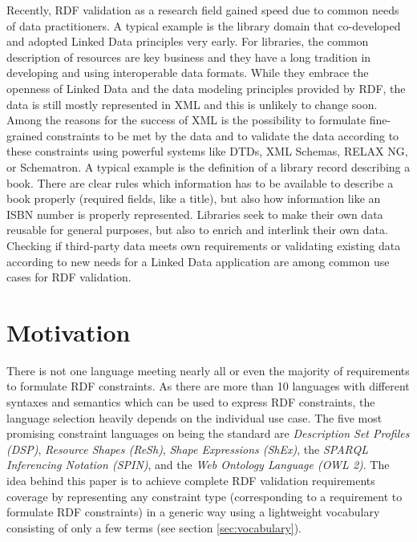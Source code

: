 \documentclass{llncs}
\begin{document}
Recently, RDF validation as a research field gained speed due to common needs of data practitioners. A typical example is the library domain that co-developed and adopted Linked Data principles very early. For libraries, the common description of resources are key business and they have a long tradition in developing and using interoperable data formats. While they embrace the openness of Linked Data and the data modeling principles provided by RDF, the data is still mostly represented in XML and this is unlikely to change soon. 
Among the reasons for the success of XML is the possibility to formulate fine-grained constraints to be met by the data and to validate the data according to these constraints using powerful systems like DTDs, XML Schemas, RELAX NG, or Schematron.
A typical example is the definition of a library record describing a book. There are clear rules which information has to be available to describe a book properly (required fields, like a title), but also how information like an ISBN number is properly represented. Libraries seek to make their own data reusable for general purposes, but also to enrich and interlink their own data. Checking if third-party data meets own requirements or validating existing data according to new needs for a Linked Data application are among common use cases for RDF validation.

\section{Motivation}

There is not one language meeting nearly all or even the majority of requirements to formulate RDF constraints.
As there are more than 10 languages with different syntaxes and semantics which can be used to express RDF constraints, 
the language selection heavily depends on the individual use case.
The five most promising constraint languages on being the standard are
\emph{Description Set Profiles (DSP)},
\emph{Resource Shapes (ReSh)}, 
\emph{Shape Expressions (ShEx)},
the \emph{SPARQL Inferencing Notation (SPIN)}, 
and the \emph{Web Ontology Language (OWL 2)}.
The idea behind this paper is to achieve complete RDF validation requirements coverage by representing any constraint type (corresponding to a requirement to formulate RDF constraints) in a generic way using a lightweight vocabulary consisting of only a few terms (see section \ref{sec:vocabulary}).
\end{document}
